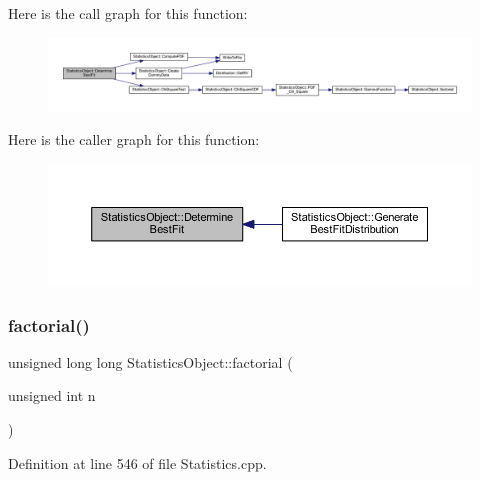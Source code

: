 Here is the call graph for this function\+:
\nopagebreak
\begin{figure}[H]
\begin{center}
\leavevmode
\includegraphics[width=350pt]{class_statistics_object_a13305945c9536243f926b61d554c2dd4_cgraph}
\end{center}
\end{figure}
Here is the caller graph for this function\+:
\nopagebreak
\begin{figure}[H]
\begin{center}
\leavevmode
\includegraphics[width=350pt]{class_statistics_object_a13305945c9536243f926b61d554c2dd4_icgraph}
\end{center}
\end{figure}
\mbox{\label{class_statistics_object_a033c5346639a0dd44b68838a49bdd926}} 
\subsubsection{\texorpdfstring{factorial()}{factorial()}}
{\footnotesize\ttfamily unsigned long long Statistics\+Object\+::factorial (\begin{DoxyParamCaption}\item[{unsigned int}]{n }\end{DoxyParamCaption})\hspace{0.3cm}{\ttfamily [protected]}}



Definition at line 546 of file Statistics.\+cpp.

